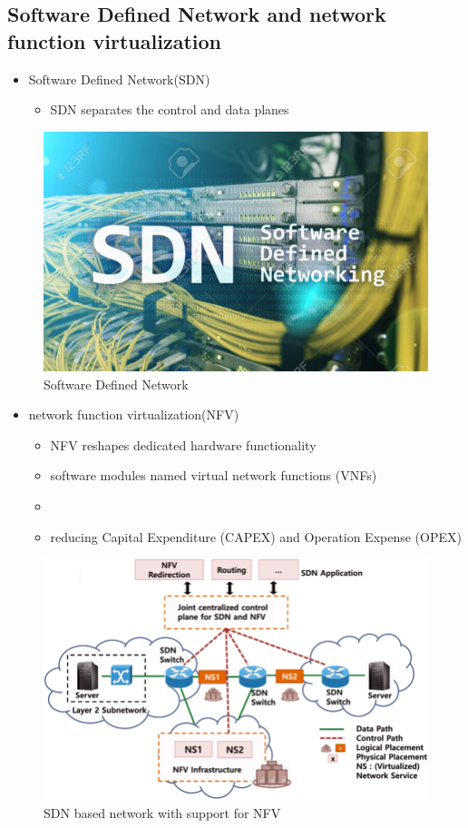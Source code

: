 \documentclass{beamer}
\begin{document}
\subsection[SDN and NFV]{Software Defined Network and network function virtualization}
\begin{frame}
	\begin{itemize}
		\item Software Defined Network(SDN)
		\begin{itemize}
			\item<1-> {SDN separates the control and data planes}
		\end{itemize}
	\end{itemize}
\begin{figure}
	\centering
	\includegraphics[width=0.7\linewidth]{sdn2}
	\caption{Software Defined Network}
	\label{fig:sdn2}
\end{figure}

\end{frame}	
\begin{frame}
\begin{itemize}
	\item network function virtualization(NFV)
	\begin{itemize}
		\item<1-> {NFV reshapes dedicated hardware functionality}
		\item<2-> {software modules named virtual network functions (VNFs)}
		\item<3-> \color{blue}{agile and scalable service placement}
		\item <4-> \color{blue} {reducing Capital
			Expenditure (CAPEX) and Operation Expense (OPEX)}
	\end{itemize}
\end{itemize}
\begin{figure}
	\centering
	\includegraphics[width=0.62\linewidth]{Architecture-of-a-software-based-network-with-support-for-network-virtualization-NFV}
	\caption{SDN based network with support for NFV}
	\label{fig:architecture-of-a-software-based-network-with-support-for-network-virtualization-nfv}
\end{figure}
\end{frame}
\end{document}
